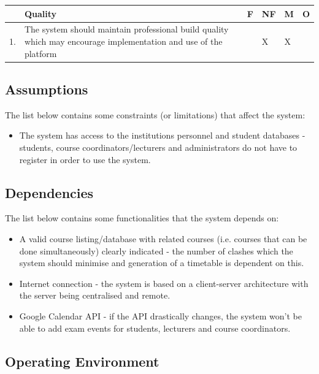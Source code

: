 \documentclass{article}
\begin{document}
\begin{center}
\begin{tabular}{|m{1cm}|m{10cm}|m{1cm}|m{1cm}|m{1cm}|m{1cm}|} 
\hline
 & \textbf{Quality} & \textbf{F} & \textbf{NF} & \textbf{M} & \textbf{O} \\
\hline
1. & {The system should maintain professional build quality which may encourage implementation and use of the platform} & & X & X & \\
\hline
\end{tabular}
\end{center}

\subsection{Assumptions}

The list below contains some constraints (or limitations) that affect the system:

\begin{itemize}
\item The system has access to the institutions personnel and student databases - students, course coordinators/lecturers and administrators do not have to register in order to use the system.
\end{itemize}

\subsection{Dependencies}

The list below contains some functionalities that the system depends on:

\begin{itemize}
\item A valid course listing/database with related courses (i.e. courses that can be done simultaneously) clearly indicated - the number of clashes which the system should minimise and generation of a timetable is dependent on this.
\item Internet connection - the system is based on a client-server architecture with the server being centralised and remote.
\item Google Calendar API - if the API drastically changes, the system won't be able to add exam events for students, lecturers and course coordinators.
\end{itemize}

\subsection{Operating Environment}
\end{document}
